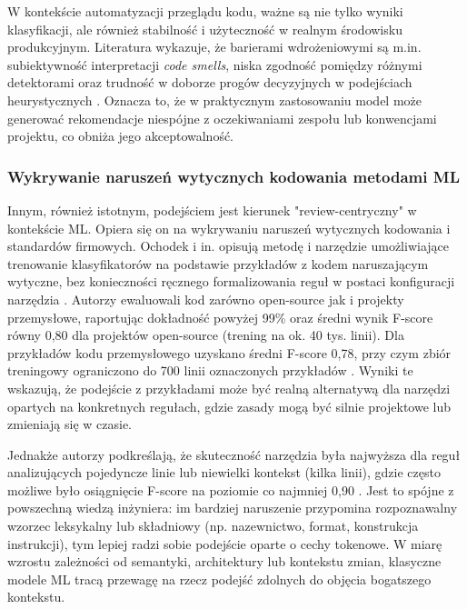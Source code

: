W kontekście automatyzacji przeglądu kodu, ważne są nie tylko wyniki klasyfikacji, ale również stabilność i użyteczność
w realnym środowisku produkcyjnym. Literatura wykazuje, że barierami wdrożeniowymi są m.in. subiektywność interpretacji
\textit{code smells}, niska zgodność pomiędzy różnymi detektorami oraz trudność w doborze progów decyzyjnych
w podejściach heurystycznych \cite{Azeem2019}. Oznacza to, że w praktycznym zastosowaniu model może generować
rekomendacje niespójne z oczekiwaniami zespołu lub konwencjami projektu, co obniża jego akceptowalność.

\subsubsection{Wykrywanie naruszeń wytycznych kodowania metodami ML}
Innym, również istotnym, podejściem jest kierunek "review-centryczny" w kontekście ML. Opiera się on na wykrywaniu
naruszeń wytycznych kodowania i standardów firmowych. Ochodek i in. opisują metodę i narzędzie umożliwiające trenowanie
klasyfikatorów na podstawie przykładów z kodem naruszającym wytyczne, bez konieczności ręcznego formalizowania reguł w postaci
konfiguracji narzędzia \cite{Ochodek2020}. Autorzy ewaluowali kod zarówno open-source jak i projekty przemysłowe, raportując
dokładność powyżej 99\% oraz średni wynik F-score równy 0{,}80 dla projektów open-source (trening na ok. 40 tys. linii).
Dla przykładów kodu przemysłowego uzyskano średni F-score 0{,}78, przy czym zbiór treningowy ograniczono do 700 linii
oznaczonych przykładów \cite{Ochodek2020}. Wyniki te wskazują, że podejście z przykładami może być realną alternatywą
dla narzędzi opartych na konkretnych regułach, gdzie zasady mogą być silnie projektowe lub zmieniają się w czasie.

Jednakże autorzy podkreślają, że skuteczność narzędzia była najwyższa dla reguł analizujących pojedyncze linie
lub niewielki kontekst (kilka linii), gdzie często możliwe było osiągnięcie F-score na poziomie co najmniej 0{,}90 \cite{Ochodek2020}.
Jest to spójne z powszechną wiedzą inżyniera: im bardziej naruszenie przypomina rozpoznawalny wzorzec leksykalny lub
składniowy (np. nazewnictwo, format, konstrukcja instrukcji), tym lepiej radzi sobie podejście oparte o cechy tokenowe.
W miarę wzrostu zależności od semantyki, architektury lub kontekstu zmian, klasyczne modele ML tracą przewagę na rzecz
podejść zdolnych do objęcia bogatszego kontekstu.

